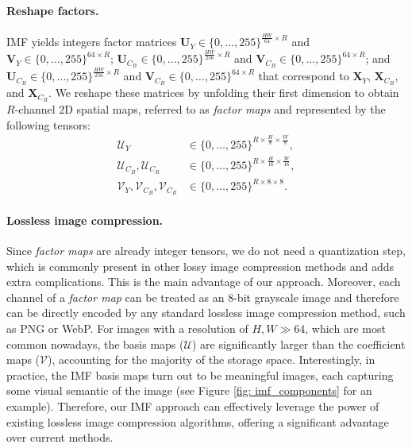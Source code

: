 \paragraph{Reshape factors.} 
IMF yields integers factor matrices $\bm{U}_{Y} \in \{0, \ldots, 255\}^{\frac{HW}{64} \times R}$ and $\bm{V}_{Y} \in \{0, \ldots, 255\}^{64 \times R}$; $\bm{U}_{C_B} \in \{0, \ldots, 255\}^{\frac{HW}{256} \times R}$ and $\bm{V}_{C_B} \in \{0, \ldots, 255\}^{64 \times R}$; and $\bm{U}_{C_R} \in \{0, \ldots, 255\}^{\frac{HW}{256} \times R}$ and $\bm{V}_{C_R} \in \{0, \ldots, 255\}^{64 \times R}$ that correspond to $\bm{X}_{Y}$, $\bm{X}_{C_B}$, and $\bm{X}_{C_R}$. We reshape these matrices by unfolding their first dimension to obtain $R$-channel 2D spatial maps, referred to as \emph{factor maps} and represented by the following tensors:
\begin{align} \label{eq: reshaped factors}
	\bm{\mathcal{U}}_{Y} & \in \{0, \ldots, 255\}^{R \times \frac{H}{8} \times \frac{W}{8}}, \nonumber \\
	\bm{\mathcal{U}}_{C_B}, \bm{\mathcal{U}}_{C_R} & \in \{0, \ldots, 255\}^{R \times \frac{H}{16} \times \frac{W}{16}}, \\
	\bm{\mathcal{V}}_{Y}, \bm{\mathcal{V}}_{C_B}, \bm{\mathcal{V}}_{C_R} & \in \{0, \ldots, 255\}^{R \times 8 \times 8}. \nonumber
\end{align}

\paragraph{Lossless image compression.}
Since \emph{factor maps} are already integer tensors, we do not need a quantization step, which is commonly present in other lossy image compression methods and adds extra complications. This is the main advantage of our approach. Moreover, each channel of a \emph{factor map} can be treated as an 8-bit grayscale image and therefore can be directly encoded by any standard lossless image compression method, such as PNG or WebP. For images with a resolution of $H, W \gg 64$, which are most common nowadays, the basis maps ($\bm{\mathcal{U}}$) are significantly larger than the coefficient maps ($\bm{\mathcal{V}}$), accounting for the majority of the storage space. Interestingly, in practice, the IMF basis maps turn out to be meaningful images, each capturing some visual semantic of the image (see Figure \ref{fig: imf_components} for an example). Therefore, our IMF approach can effectively leverage the power of existing lossless image compression algorithms, offering a significant advantage over current methods.

